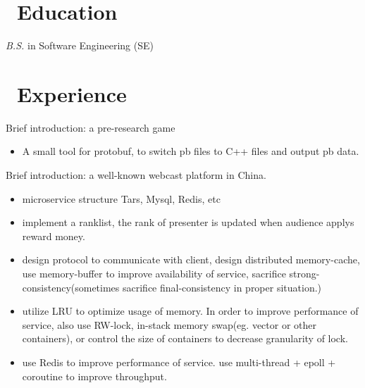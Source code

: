 \documentclass{resume}
\begin{document}



\section{\faGraduationCap\ Education}
\textit{B.S.} in Software Engineering (SE)

\section{\faUsers\ Experience}
Brief introduction: a pre-research game
\begin{itemize}
  \item A small tool for protobuf, to switch pb files to C++ files and output pb data.
\end{itemize}

Brief introduction: a well-known webcast platform in China. 
\begin{itemize}
  \item microservice structure Tars, Mysql, Redis, etc
  \item implement a ranklist, the rank of presenter is updated when audience applys reward money.
  \item design protocol to communicate with client, design distributed memory-cache, use memory-buffer to improve availability of service, sacrifice strong-consistency(sometimes sacrifice final-consistency in proper situation.)
  \item utilize LRU to optimize usage of memory. In order to improve performance of service, also use RW-lock, in-stack memory swap(eg. vector or other containers), or control the size of containers to decrease granularity of lock. 
  \item use Redis to improve performance of service. use multi-thread + epoll + coroutine to improve throughput.
\end{itemize}
\end{document}

